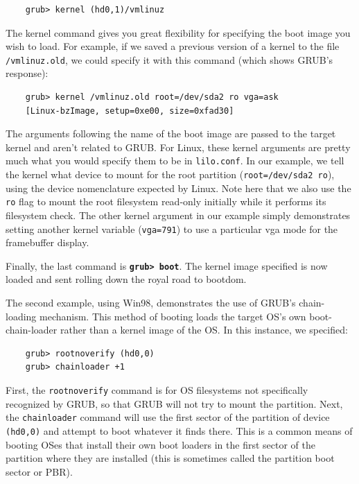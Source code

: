\documentclass{article}
\begin{document}
\begin{verbatim}
    grub> kernel (hd0,1)/vmlinuz
\end{verbatim}

The kernel command gives you great flexibility for specifying the boot image you wish to load.
For example, if we saved a previous version of a kernel to the file \texttt{/vmlinuz.old},
we could specify it with this command (which shows GRUB's response):

\begin{verbatim}
    grub> kernel /vmlinuz.old root=/dev/sda2 ro vga=ask
    [Linux-bzImage, setup=0xe00, size=0xfad30]
\end{verbatim}

The arguments following the name of the boot image are passed to the target kernel and aren't related to GRUB. For Linux, these kernel arguments are pretty much what you would specify them to be in \texttt{lilo.conf}.
In our example, we tell the kernel what device to mount for the root partition (\texttt{root=/dev/sda2 ro}), using the device nomenclature expected by Linux.
Note here that we also use the \texttt{ro} flag to mount the root filesystem read-only initially while it performs its filesystem check.
The other kernel argument in our example simply demonstrates setting another kernel variable (\texttt{vga=791}) to use a particular vga mode for the framebuffer display.

Finally, the last command is \textbf{\texttt{grub> boot}}. The kernel image specified is now loaded and sent rolling down the royal road to bootdom.

The second example, using Win98, demonstrates the use of GRUB's chain-loading mechanism. This method of booting loads the target OS's own boot-chain-loader rather than a kernel image of the OS. In this instance, we specified:

\begin{verbatim}
    grub> rootnoverify (hd0,0)
    grub> chainloader +1
\end{verbatim}

First, the \texttt{rootnoverify} command is for OS filesystems not specifically recognized by GRUB,
so that GRUB will not try to mount the partition.
Next, the \texttt{chainloader} command will use the first sector of the partition of device \texttt{(hd0,0)} and attempt to boot whatever it finds there.
This is a common means of booting OSes that install their own boot loaders in the first sector of the partition where they are installed (this is sometimes called the partition boot sector or PBR).
\end{document}
